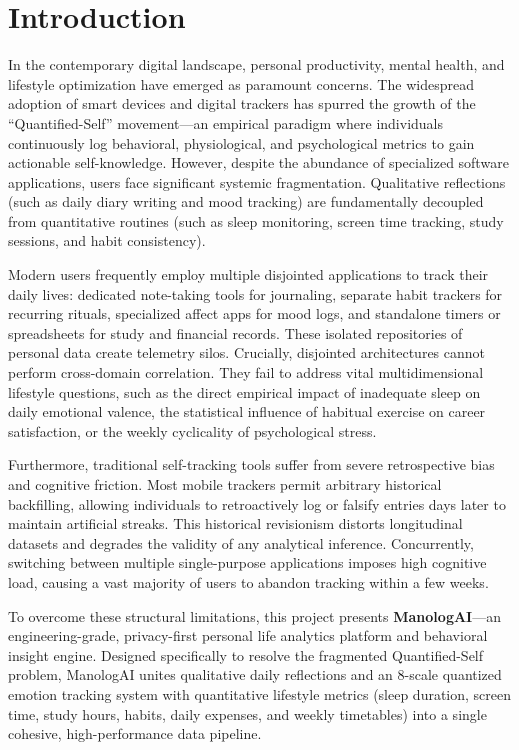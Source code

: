 \chapter{Introduction}
\label{Chapter1}

In the contemporary digital landscape, personal productivity, mental health, and lifestyle optimization have emerged as paramount concerns. The widespread adoption of smart devices and digital trackers has spurred the growth of the ``Quantified-Self'' movement---an empirical paradigm where individuals continuously log behavioral, physiological, and psychological metrics to gain actionable self-knowledge. However, despite the abundance of specialized software applications, users face significant systemic fragmentation. Qualitative reflections (such as daily diary writing and mood tracking) are fundamentally decoupled from quantitative routines (such as sleep monitoring, screen time tracking, study sessions, and habit consistency). 

Modern users frequently employ multiple disjointed applications to track their daily lives: dedicated note-taking tools for journaling, separate habit trackers for recurring rituals, specialized affect apps for mood logs, and standalone timers or spreadsheets for study and financial records. These isolated repositories of personal data create telemetry silos. Crucially, disjointed architectures cannot perform cross-domain correlation. They fail to address vital multidimensional lifestyle questions, such as the direct empirical impact of inadequate sleep on daily emotional valence, the statistical influence of habitual exercise on career satisfaction, or the weekly cyclicality of psychological stress.

Furthermore, traditional self-tracking tools suffer from severe retrospective bias and cognitive friction. Most mobile trackers permit arbitrary historical backfilling, allowing individuals to retroactively log or falsify entries days later to maintain artificial streaks. This historical revisionism distorts longitudinal datasets and degrades the validity of any analytical inference. Concurrently, switching between multiple single-purpose applications imposes high cognitive load, causing a vast majority of users to abandon tracking within a few weeks.

To overcome these structural limitations, this project presents \textbf{ManologAI}---an engineering-grade, privacy-first personal life analytics platform and behavioral insight engine. Designed specifically to resolve the fragmented Quantified-Self problem, ManologAI unites qualitative daily reflections and an 8-scale quantized emotion tracking system with quantitative lifestyle metrics (sleep duration, screen time, study hours, habits, daily expenses, and weekly timetables) into a single cohesive, high-performance data pipeline. 

